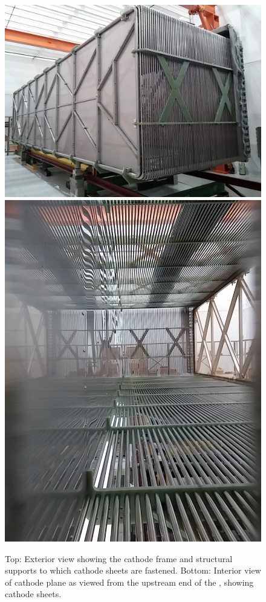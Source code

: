 \begin{figure}
\centering	
\includegraphics[width=0.62\linewidth]{figures/tpc-completed-upstream-left.jpg}
\includegraphics[width=0.62\linewidth]{figures/tpc-upstream-interior.jpg}
\caption{Top: Exterior view showing the cathode frame and structural supports to which cathode sheets are fastened.  Bottom: Interior view of cathode plane as viewed from the upstream end of the \lartpc, showing cathode sheets.}
\label{fig:tpc-cathode}
\end{figure}


